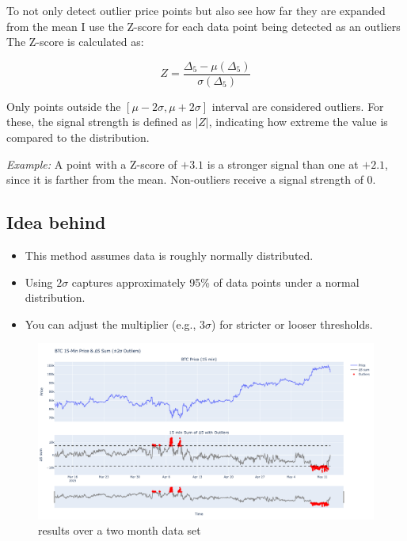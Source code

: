 \documentclass[12pt]{article}
\begin{document}
To not only detect outlier price points but also see how far they are expanded from the mean I use the Z-score for each data point being detected as an outliers
\newpage
The Z-score is calculated as:

\[
Z = \frac{\Delta_5 - \mu(\Delta_5)}{\sigma(\Delta_5)}
\]

Only points outside the $[\mu - 2\sigma, \mu + 2\sigma]$ interval are considered outliers.  
For these, the signal strength is defined as $|Z|$, indicating how extreme the value is compared to the distribution.

\textit{Example:}  
A point with a Z-score of $+3.1$ is a stronger signal than one at $+2.1$, since it is farther from the mean.  
Non-outliers receive a signal strength of 0.







\newpage


\subsection*{Idea behind}

\begin{itemize}
    \item This method assumes data is roughly normally distributed.
    \item Using $2\sigma$ captures approximately 95\% of data points under a normal distribution.
    \item You can adjust the multiplier (e.g., $3\sigma$) for stricter or looser thresholds.
\end{itemize}


\begin{figure}
    \centering
    \includegraphics[width=1\textwidth]{imgs/ResultsOfSTDoutlierDecection.png}
    \caption{results over a two month data set}
\end{figure}
\end{document}
